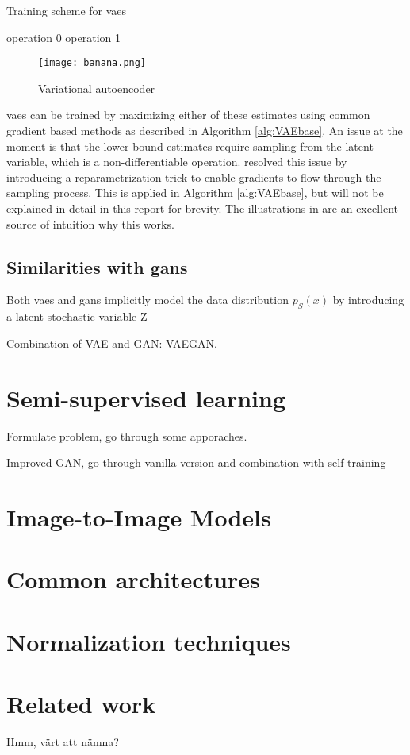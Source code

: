 \begin{algorithm}
    \caption{Training scheme for \acrlong{vaes}}
  \label{alg:VAEbase}
  \begin{algorithmic}[1]
    \STATE operation 0 \label{op0}
    \STATE operation 1 \label{op1}
  \end{algorithmic}
\end{algorithm}

\begin{figure}
    \caption{Variational autoencoder}
    \label{fig:VAE}
    \centering
    \texttt{[image: banana.png]}
\end{figure}

\acrshort{vaes} can be trained by maximizing either of these estimates using common gradient based methods as described in Algorithm \ref{alg:VAEbase}. An issue at the moment is that the lower bound estimates require sampling from the latent variable, which is a non-differentiable operation. \textcite{kingma2013auto} resolved this issue by introducing a reparametrization trick to enable gradients to flow through the sampling process. This is applied in Algorithm \ref{alg:VAEbase}, but will not be explained in detail in this report for brevity. The illustrations in \parencite{doersch2016tutorial} are an excellent source of intuition why this works.

\subsection{Similarities with \acrshort{gans}}
Both \acrshort{vaes} and \acrshort{gans} implicitly model the data distribution $p_S(x)$ by introducing a latent stochastic variable Z

Combination of VAE and GAN: VAEGAN. \textcite{LarsenSW15autoencodingbeyond}

\section{Semi-supervised learning}
Formulate problem, go through some apporaches.

Improved GAN, go through vanilla version and combination with self training \cite{wuliu2017selftrainsemisup}

\section{Image-to-Image Models}

\section{Common architectures}

\section{Normalization techniques}

\section{Related work}
Hmm, värt att nämna? 






